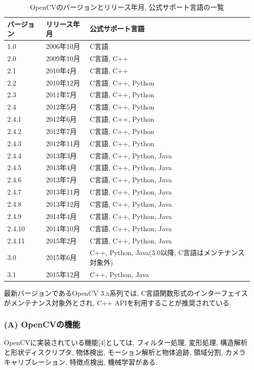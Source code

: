 \begin{table}[htb]
\begin{center}
\begin{tabular}{|l|l|l|} \hline
バージョン & リリース年月 & 公式サポート言語 \\ \hline \hline
1.0 & 2006年10月 & C言語 \\ \hline
2.0 & 2009年10月 & C言語, C++ \\ \hline
2.1 & 2010年4月 & C言語, C++ \\ \hline
2.2 & 2010年12月 & C言語, C++, Python \\ \hline
2.3 & 2011年7月 & C言語, C++, Python \\ \hline
2.4 & 2012年5月 & C言語, C++, Python \\ \hline
2.4.1 & 2012年6月 & C言語, C++, Python \\ \hline
2.4.2 & 2012年7月 & C言語, C++, Python \\ \hline
2.4.3 & 2012年11月 & C言語, C++, Python \\ \hline
2.4.4 & 2013年3月 & C言語, C++, Python, Java \\ \hline
2.4.5 & 2013年4月 & C言語, C++, Python, Java \\ \hline
2.4.6 & 2013年7月 & C言語, C++, Python, Java \\ \hline
2.4.7 & 2013年11月 & C言語, C++, Python, Java \\ \hline
2.4.8 & 2013年12月 & C言語, C++, Python, Java \\ \hline
2.4.9 & 2014年4月 & C言語, C++, Python, Java \\ \hline
2.4.10 & 2014年10月 & C言語, C++, Python, Java \\ \hline
2.4.11 & 2015年2月 & C言語, C++, Python, Java \\ \hline
3.0 & 2015年6月 & C++, Python, Java(3.0以降, C言語はメンテナンス対象外) \\ \hline
3.1 & 2015年12月 & C++, Python, Java \\ \hline
\end{tabular}
\caption{OpenCVのバージョンとリリース年月, 公式サポート言語の一覧}
\end{center}
\end{table}

最新バージョンであるOpenCV 3.x系列では, C言語関数形式のインターフェイスがメンテナンス対象外とされ, C++ APIを利用することが推奨されている.

\subsubsection{(A) OpenCVの機能}
OpenCVに実装されている機能[4]としては, フィルター処理, 変形処理, 構造解析と形状ディスクリプタ, 物体検出, モーション解析と物体追跡, 領域分割, カメラキャリブレーション, 特徴点検出, 機械学習がある.

